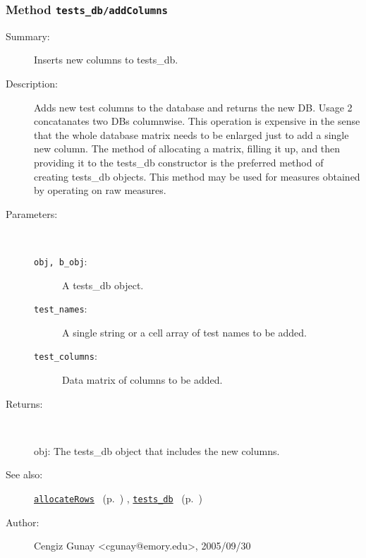 \subsubsection[Method \texttt{addColumns}]{Method \texttt{tests\_db/addColumns}}%
%
\label{ref_tests_db__addColumns}%
\hypertarget{ref_tests_db__addColumns}{}%
\begin{description}
\item[Summary:]Inserts new columns to tests\_db.
%
%
\item[Description:]%
Adds new test columns to the database and returns the new DB.
 Usage 2 concatanates two DBs columnwise. This operation is 
 expensive in the sense that the whole database matrix needs to be 
 enlarged just to add a single new column. The method of allocating
 a matrix, filling it up, and then providing it to the tests\_db 
 constructor is the preferred method of creating tests\_db objects. 
 This method may be used for measures obtained by operating on raw measures.
\item[Parameters:]~
\begin{description}%
\item[\texttt{obj, b\_obj}:]
 A tests\_db object.
\item[\texttt{test\_names}:]
 A single string or a cell array of test names to be added.
\item[\texttt{test\_columns}:]
 Data matrix of columns to be added.
\end{description}%
%
\item[Returns:
]~

   obj: The tests\_db object that includes the new columns.
%
%
\item[See also:]%
\hyperlink{ref_allocateRows}{\texttt{allocateRows}}%
\ (p.~\pageref{ref_allocateRows})%
%
, \hyperlink{ref_tests_db}{\texttt{tests\_db}}%
\ (p.~\pageref{ref_tests_db})%
%
%
\item[Author:]%
Cengiz Gunay <cgunay@emory.edu>, 2005/09/30
%
\end{description}
\methodline%
